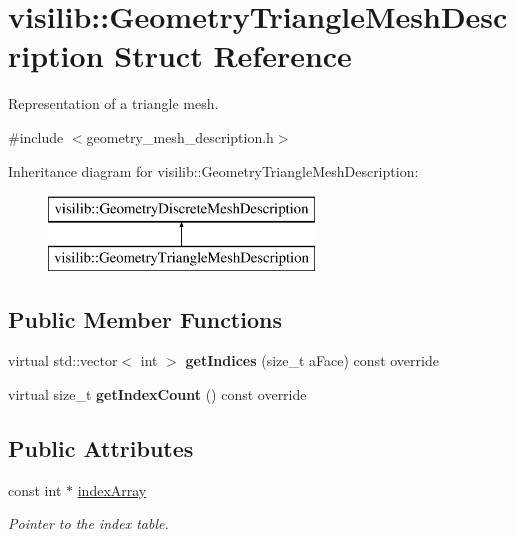 \hypertarget{structvisilib_1_1_geometry_triangle_mesh_description}{}\section{visilib\+::Geometry\+Triangle\+Mesh\+Description Struct Reference}
\label{structvisilib_1_1_geometry_triangle_mesh_description}


Representation of a triangle mesh.  




{\ttfamily \#include $<$geometry\+\_\+mesh\+\_\+description.\+h$>$}

Inheritance diagram for visilib\+::Geometry\+Triangle\+Mesh\+Description\+:\begin{figure}[H]
\begin{center}
\leavevmode
\includegraphics[height=2.000000cm]{structvisilib_1_1_geometry_triangle_mesh_description}
\end{center}
\end{figure}
\subsection*{Public Member Functions}
\begin{DoxyCompactItemize}
\item 
\mbox{\label{structvisilib_1_1_geometry_triangle_mesh_description_ac3bbf60ef76b5bbbd8731ca75113a1c7}} 
virtual std\+::vector$<$ int $>$ {\bfseries get\+Indices} (size\+\_\+t a\+Face) const override
\item 
\mbox{\label{structvisilib_1_1_geometry_triangle_mesh_description_a7fd6d7e8f1a287607a18ad507be4c283}} 
virtual size\+\_\+t {\bfseries get\+Index\+Count} () const override
\end{DoxyCompactItemize}
\subsection*{Public Attributes}
\begin{DoxyCompactItemize}
\item 
\mbox{\label{structvisilib_1_1_geometry_triangle_mesh_description_a161f5e6343b08d34bac9eb58b6ee6aa5}} 
const int $\ast$ \mbox{\hyperlink{structvisilib_1_1_geometry_triangle_mesh_description_a161f5e6343b08d34bac9eb58b6ee6aa5}{index\+Array}}
\begin{DoxyCompactList}\small\item\em Pointer to the index table. \end{DoxyCompactList}\end{DoxyCompactItemize}


